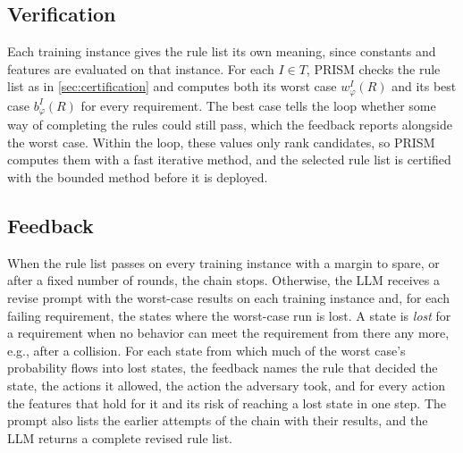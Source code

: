 \subsection{Verification}
\label{sec:verification}

Each training instance gives the rule list its own meaning, since constants and features are evaluated on that instance.
For each $I \in T$, PRISM checks the rule list as in \autoref{sec:certification} and computes both its worst case $w_\varphi^I(R)$ and its best case $b_\varphi^I(R)$ for every requirement.
The best case tells the loop whether some way of completing the rules could still pass, which the feedback reports alongside the worst case.
Within the loop, these values only rank candidates, so PRISM computes them with a fast iterative method, and the selected rule list is certified with the bounded method before it is deployed.

\subsection{Feedback}
\label{sec:feedback}

When the rule list passes on every training instance with a margin to spare, or after a fixed number of rounds, the chain stops.
Otherwise, the LLM receives a revise prompt with the worst-case results on each training instance and, for each failing requirement, the states where the worst-case run is lost.
A state is \textit{lost} for a requirement when no behavior can meet the requirement from there any more, e.g., after a collision.
For each state from which much of the worst case's probability flows into lost states, the feedback names the rule that decided the state, the actions it allowed, the action the adversary took, and for every action the features that hold for it and its risk of reaching a lost state in one step.
The prompt also lists the earlier attempts of the chain with their results, and the LLM returns a complete revised rule list.

